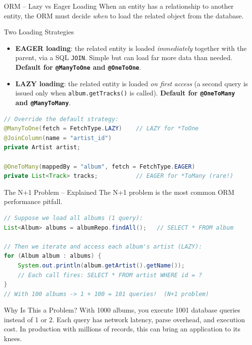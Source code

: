 \begin{frame}[fragile]{ORM -- Lazy vs Eager Loading}
  When an entity has a relationship to another entity, the ORM must decide
  \emph{when} to load the related object from the database.

  \begin{block}{Two Loading Strategies}
    \begin{itemize}
      \item \textbf{EAGER loading}: the related entity is loaded \emph{immediately} together
            with the parent, via a SQL \texttt{JOIN}. Simple but can load far more data than needed.
            \textbf{Default for \texttt{@ManyToOne} and \texttt{@OneToOne}}.
      \item \textbf{LAZY loading}: the related entity is loaded \emph{on first access} (a second
            query is issued only when \texttt{album.getTracks()} is called).
            \textbf{Default for \texttt{@OneToMany} and \texttt{@ManyToMany}}.
    \end{itemize}
  \end{block}

  \begin{lstlisting}[style=sqlstyle, language=Java]
// Override the default strategy:
@ManyToOne(fetch = FetchType.LAZY)    // LAZY for *ToOne
@JoinColumn(name = "artist_id")
private Artist artist;

@OneToMany(mappedBy = "album", fetch = FetchType.EAGER)
private List<Track> tracks;           // EAGER for *ToMany (rare!)
  \end{lstlisting}
\end{frame}

\begin{frame}[fragile]{The N+1 Problem -- Explained}
  The N+1 problem is the most common ORM performance pitfall.

  \begin{lstlisting}[style=sqlstyle, language=Java]
// Suppose we load all albums (1 query):
List<Album> albums = albumRepo.findAll();   // SELECT * FROM album

// Then we iterate and access each album's artist (LAZY):
for (Album album : albums) {
    System.out.println(album.getArtist().getName());
    // Each call fires: SELECT * FROM artist WHERE id = ?
}
// With 100 albums -> 1 + 100 = 101 queries!  (N+1 problem)
  \end{lstlisting}

  \begin{alertblock}{Why Is This a Problem?}
    With 1000 albums, you execute 1001 database queries instead of 1 or 2.
    Each query has network latency, parse overhead, and execution cost.
    In production with millions of records, this can bring an application to its knees.
  \end{alertblock}
\end{frame}

